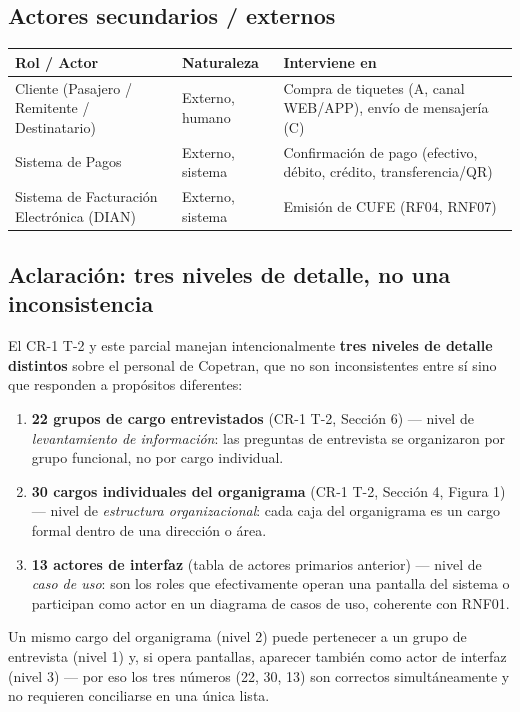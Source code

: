 \documentclass[11pt,a4paper]{article}
\begin{document}
\subsection{Actores secundarios / externos}

{
\begin{longtable}{L{5.5cm} L{2.8cm} L{6.4cm}}
\toprule
{}\textbf{Rol / Actor} & \textbf{Naturaleza} & \textbf{Interviene en} \\
\midrule
\endhead
Cliente (Pasajero / Remitente / Destinatario) & Externo, humano & Compra de tiquetes (A, canal WEB/APP), envío de mensajería (C) \\
Sistema de Pagos & Externo, sistema & Confirmación de pago (efectivo, débito, crédito, transferencia/QR) \\
Sistema de Facturación Electrónica (DIAN) & Externo, sistema & Emisión de CUFE (RF04, RNF07) \\
\bottomrule
\end{longtable}
}

\subsection*{Aclaración: tres niveles de detalle, no una inconsistencia}

El CR-1 T-2 y este parcial manejan intencionalmente \textbf{tres niveles de detalle distintos} sobre
el personal de Copetran, que no son inconsistentes entre sí sino que responden a propósitos
diferentes:

\begin{enumerate}[nosep]
  \item \textbf{22 grupos de cargo entrevistados} (CR-1 T-2, Sección 6) --- nivel de \emph{levantamiento
  de información}: las preguntas de entrevista se organizaron por grupo funcional, no por cargo
  individual.
  \item \textbf{30 cargos individuales del organigrama} (CR-1 T-2, Sección 4, Figura 1) --- nivel de
  \emph{estructura organizacional}: cada caja del organigrama es un cargo formal dentro de una
  dirección o área.
  \item \textbf{13 actores de interfaz} (tabla de actores primarios anterior) --- nivel de \emph{caso
  de uso}: son los roles que efectivamente operan una pantalla del sistema o participan como actor en
  un diagrama de casos de uso, coherente con RNF01.
\end{enumerate}

Un mismo cargo del organigrama (nivel 2) puede pertenecer a un grupo de entrevista (nivel 1) y, si
opera pantallas, aparecer también como actor de interfaz (nivel 3) --- por eso los tres números (22,
30, 13) son correctos simultáneamente y no requieren conciliarse en una única lista.
\end{document}
